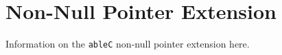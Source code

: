 \documentclass[main.tex]{subfiles}
\begin{document}
\section*{Non-Null Pointer Extension}

Information on the \verb|ableC| non-null pointer extension here.
\end{document}
